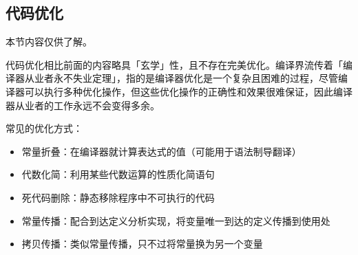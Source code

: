 \documentclass[UTF8]{ctexart}
\begin{document}
\subsection{代码优化}
本节内容仅供了解。

代码优化相比前面的内容略具「玄学」性，且不存在完美优化。编译界流传着「编译器从业者永不失业定理」，指的是编译器优化是一个复杂且困难的过程，尽管编译器可以执行多种优化操作，但这些优化操作的正确性和效果很难保证，因此编译器从业者的工作永远不会变得多余。‌

常见的优化方式：
\begin{itemize}[itemsep=0pt,parsep=0pt,leftmargin=1.5cm]
  \item 常量折叠：在编译器就计算表达式的值（可能用于语法制导翻译）
  \item 代数化简：利用某些代数运算的性质化简语句
  \item 死代码删除：静态移除程序中不可执行的代码
  \item 常量传播：配合到达定义分析实现，将变量唯一到达的定义传播到使用处
  \item 拷贝传播：类似常量传播，只不过将常量换为另一个变量
\end{itemize}

\BgThispage
\end{document}
